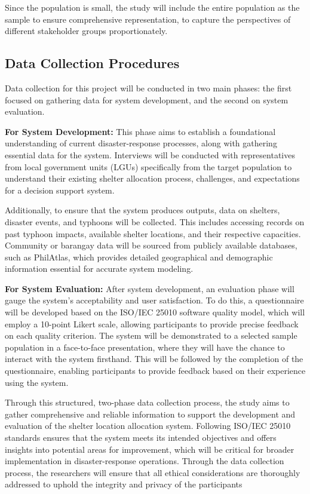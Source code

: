 	Since the population is small, the study will include the entire population as the sample to ensure comprehensive representation, to capture the perspectives of different stakeholder groups proportionately.

\subsection{Data Collection Procedures}
	Data collection for this project will be conducted in two main phases: the first focused on gathering data for system development, and the second on system evaluation.
	
	\textbf{For System Development:} This phase aims to establish a foundational understanding of current disaster-response processes, along with gathering essential data for the system. Interviews will be conducted with representatives from local government units (LGUs) specifically from the target population to understand their existing shelter allocation process, challenges, and expectations for a decision support system. 
	
	Additionally, to ensure that the system produces outputs, data on shelters, disaster events, and typhoons will be collected. This includes accessing records on past typhoon impacts, available shelter locations, and their respective capacities. Community or barangay data will be sourced from publicly available databases, such as PhilAtlas, which provides detailed geographical and demographic information essential for accurate system modeling.
	
	\textbf{For System Evaluation:} After system development, an evaluation phase will gauge the system’s acceptability and user satisfaction. To do this, a questionnaire will be developed based on the ISO/IEC 25010 software quality model, which will employ a 10-point Likert scale, allowing participants to provide precise feedback on each quality criterion. The system will be demonstrated to a selected sample population in a face-to-face presentation, where they will have the chance to interact with the system firsthand. This will be followed by the completion of the questionnaire, enabling participants to provide feedback based on their experience using the system.
	
	Through this structured, two-phase data collection process, the study aims to gather comprehensive and reliable information to support the development and evaluation of the shelter location allocation system. Following ISO/IEC 25010 standards ensures that the system meets its intended objectives and offers insights into potential areas for improvement, which will be critical for broader implementation in disaster-response operations. Through the data collection process, the researchers will ensure that all ethical considerations are thoroughly addressed to uphold the integrity and privacy of the participants


